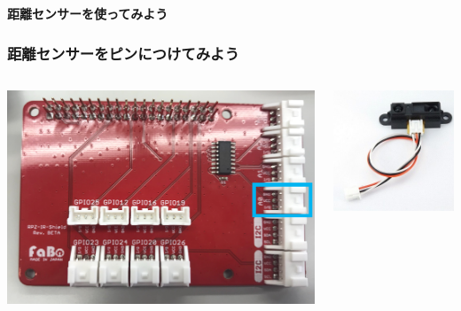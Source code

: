 \begin{frame}[plain]
    \begin{center}
        \vspace{48pt}
        {\huge\bf 距離センサーを使ってみよう}
    \end{center}
\end{frame}

\begin{frame}[fragile]
    \frametitle{距離センサーをピンにつけてみよう}
    \begin{columns}
        \begin{column}{0.48\textwidth}
            \includegraphics[width=\textwidth]{images/chap05/text05-img030.png} 
        \end{column}
        \begin{column}{0.48\textwidth}
            \includegraphics[width=\textwidth]{images/chap05/text05-img023.jpg} 

\end{column}
\end{columns}
\end{frame}
